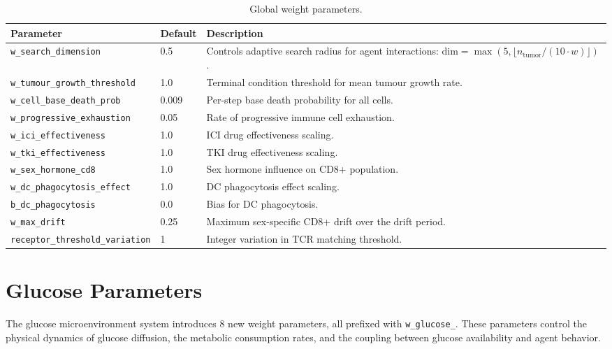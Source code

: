 \begin{table}[H]
\centering
\caption{Global weight parameters.}
\label{tab:global-weights}
\begin{tabular}{@{}llp{5.5cm}@{}}
\toprule
\textbf{Parameter} & \textbf{Default} & \textbf{Description} \\
\midrule
\texttt{w\_search\_dimension} & 0.5 & Controls adaptive search radius for agent interactions: $\mathrm{dim} = \max(5, \lfloor n_{\mathrm{tumor}} / (10 \cdot w) \rfloor)$. \\
\texttt{w\_tumour\_growth\_threshold} & 1.0 & Terminal condition threshold for mean tumour growth rate. \\
\texttt{w\_cell\_base\_death\_prob} & 0.009 & Per-step base death probability for all cells. \\
\texttt{w\_progressive\_exhaustion} & 0.05 & Rate of progressive immune cell exhaustion. \\
\texttt{w\_ici\_effectiveness} & 1.0 & ICI drug effectiveness scaling. \\
\texttt{w\_tki\_effectiveness} & 1.0 & TKI drug effectiveness scaling. \\
\texttt{w\_sex\_hormone\_cd8} & 1.0 & Sex hormone influence on CD8+ population. \\
\texttt{w\_dc\_phagocytosis\_effect} & 1.0 & DC phagocytosis effect scaling. \\
\texttt{b\_dc\_phagocytosis} & 0.0 & Bias for DC phagocytosis. \\
\texttt{w\_max\_drift} & 0.25 & Maximum sex-specific CD8+ drift over the drift period. \\
\texttt{receptor\_threshold\_variation} & 1 & Integer variation in TCR matching threshold. \\
\bottomrule
\end{tabular}
\end{table}

\section{Glucose Parameters}
\label{sec:glucose-params}

The glucose microenvironment system introduces 8 new weight parameters, all prefixed with \texttt{w\_glucose\_}. These parameters control the physical dynamics of glucose diffusion, the metabolic consumption rates, and the coupling between glucose availability and agent behavior.

